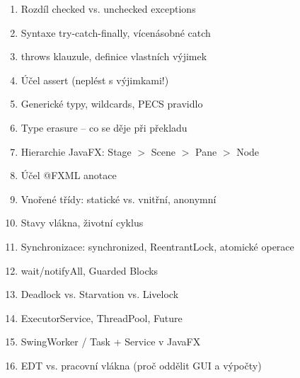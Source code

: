 \documentclass[11pt,a4paper]{article}
\begin{document}
\begin{tcolorbox}[tipbox,title=Kontrolní seznam před testem]
\begin{enumerate}
    \item[$\square$] Rozdíl checked vs. unchecked exceptions
    \item[$\square$] Syntaxe try-catch-finally, vícenásobné catch
    \item[$\square$] throws klauzule, definice vlastních výjimek
    \item[$\square$] Účel assert (neplést s výjimkami!)
    \item[$\square$] Generické typy, wildcards, PECS pravidlo
    \item[$\square$] Type erasure -- co se děje při překladu
    \item[$\square$] Hierarchie JavaFX: Stage $>$ Scene $>$ Pane $>$ Node
    \item[$\square$] Účel @FXML anotace
    \item[$\square$] Vnořené třídy: statické vs. vnitřní, anonymní
    \item[$\square$] Stavy vlákna, životní cyklus
    \item[$\square$] Synchronizace: synchronized, ReentrantLock, atomické operace
    \item[$\square$] wait/notifyAll, Guarded Blocks
    \item[$\square$] Deadlock vs. Starvation vs. Livelock
    \item[$\square$] ExecutorService, ThreadPool, Future
    \item[$\square$] SwingWorker / Task + Service v JavaFX
    \item[$\square$] EDT vs. pracovní vlákna (proč oddělit GUI a výpočty)
\end{enumerate}
\end{tcolorbox}
\end{document}

